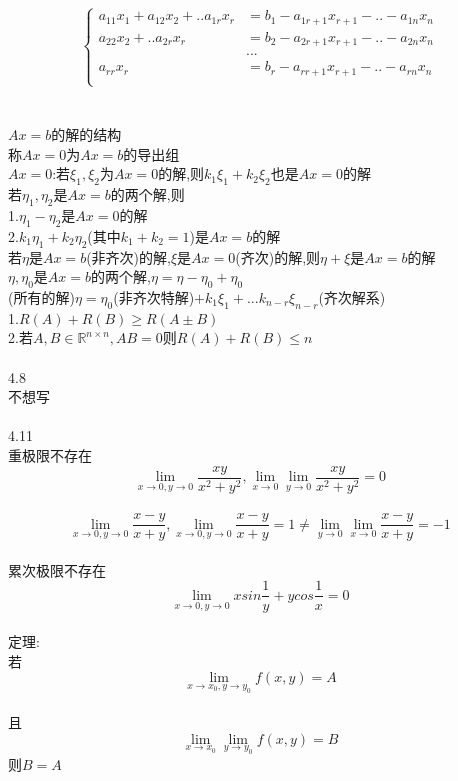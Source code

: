 \documentclass[11pt, a4paper, UTF8]{ctexart}
\begin{document}
$$ 
\left\{
\begin{aligned}
a_{11}x_1+a_{12}x_2+..a_{1r}x_r&=b_1-a_{1r+1}x_{r+1}-..-a_{1n}x_n\\
a_{22}x_2+..a_{2r}x_r&=b_2-a_{2r+1}x_{r+1}-..-a_{2n}x_n\\
&...\\
a_{rr}x_r&=b_r-a_{rr+1}x_{r+1}-..-a_{rn}x_n\\
\end{aligned}
\right.
$$\\
\\
$ Ax=b $的解的结构\\
称$ Ax=0 $为$ Ax=b $的导出组\\
$ Ax=0 $:若$ \xi_1,\xi_2 $为$ Ax=0 $的解,则$ k_1\xi_1+k_2\xi_2 $也是$ Ax=0 $的解\\
若$ \eta_1,\eta_2 $是$ Ax=b $的两个解,则\\
1.$ \eta_1-\eta_2 $是$ Ax=0 $的解\\
2.$ k_1\eta_1+k_2\eta_2 $(其中$ k_1+k_2=1 $)是$ Ax=b $的解\\
若$ \eta $是$ Ax=b $(非齐次)的解,$ \xi $是$ Ax=0 $(齐次)的解,则$ \eta+\xi $是$ Ax=b $的解\\
$ \eta,\eta_0 $是$ Ax=b $的两个解,$ \eta=\eta-\eta_0+\eta_0 $\\
(所有的解)$ \eta=\eta_0 $(非齐次特解)$ +k_1\xi_1+...k_{n-r}\xi_{n-r} $(齐次解系)\\
1.$ R(A)+R(B)\ge R(A\pm B) $\\
2.若$ A,B\in\mathbb{R}^{n\times n},AB=0 $则$ R(A)+R(B)\le n $\\
\\
4.8\\
不想写\\
\\
4.11\\
重极限不存在\\
$$\lim_{x\to0,y\to0}\dfrac{xy}{x^2+y^2},\lim_{x\to0}\lim_{y\to0}\dfrac{xy}{x^2+y^2}=0$$\\
$$\lim_{x\to0,y\to0}\dfrac{x-y}{x+y},\lim_{x\to0,y\to0}\dfrac{x-y}{x+y}=1\not=\lim_{y\to0}\lim_{x\to0}\dfrac{x-y}{x+y}=-1$$\\
累次极限不存在\\
$$\lim_{x\to0,y\to0}xsin\dfrac{1}{y}+ycos\dfrac{1}{x}=0$$\\
定理:\\
若$$\lim_{x\to x_0,y\to y_0}f(x,y)=A$$\\
且$$\lim_{x\to x_0}\lim_{y\to y_0}f(x,y)=B$$
则$ B=A $\\
\end{document}
